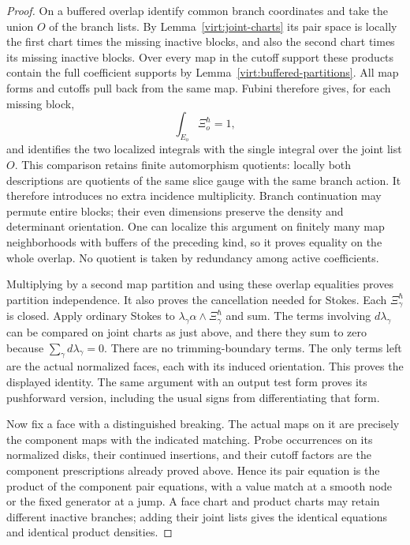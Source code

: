 \begin{proof}
On a buffered overlap identify common branch coordinates and take the
union $O$ of the branch lists.  By Lemma~\ref{virt:joint-charts} its pair
space is locally the first chart times the missing inactive blocks, and
also the second chart times its missing inactive blocks.  Over every
map in the cutoff support these products contain the full coefficient
supports by Lemma~\ref{virt:buffered-partitions}.  All map forms and
cutoffs pull back from the same map.  Fubini therefore gives, for each
missing block,
\[
 \int_{E_o}\Xi_o^\hbar=1,
\]
and identifies the two localized integrals with the single integral
over the joint list $O$.  This comparison retains finite automorphism
quotients: locally both descriptions are quotients of the same slice
gauge with the same branch action.  It therefore introduces no extra
incidence multiplicity.  Branch continuation may permute entire blocks;
their even dimensions preserve the density and determinant orientation.
One can localize this argument on finitely many map neighborhoods with
buffers of the preceding kind, so it proves equality on the whole
overlap.  No quotient is taken by redundancy among active coefficients.

Multiplying by a second map partition and using these overlap equalities
proves partition independence.  It also proves the cancellation needed
for Stokes.  Each $\Xi_\gamma^\hbar$ is closed.  Apply ordinary Stokes
to $\lambda_\gamma\alpha\wedge\Xi_\gamma^\hbar$ and sum.  The
terms involving $d\lambda_\gamma$ can be compared on joint charts as
just above, and there they sum to zero because
$\sum_\gamma d\lambda_\gamma=0$.  There are no trimming-boundary
terms.  The only terms left are the actual normalized faces, each with
its induced orientation.  This proves the displayed identity.  The
same argument with an output test form proves its pushforward version,
including the usual signs from differentiating that form.

Now fix a face with a distinguished breaking.  The actual maps on it
are precisely the component maps with the indicated matching.  Probe
occurrences on its normalized disks, their continued insertions, and
their cutoff factors are the component prescriptions already proved
above.  Hence its pair equation is the product of the component pair
equations, with a value match at a smooth node or the fixed generator
at a jump.  A face chart and product charts may retain different
inactive branches; adding their joint lists gives the identical
equations and identical product densities.


\end{proof}
